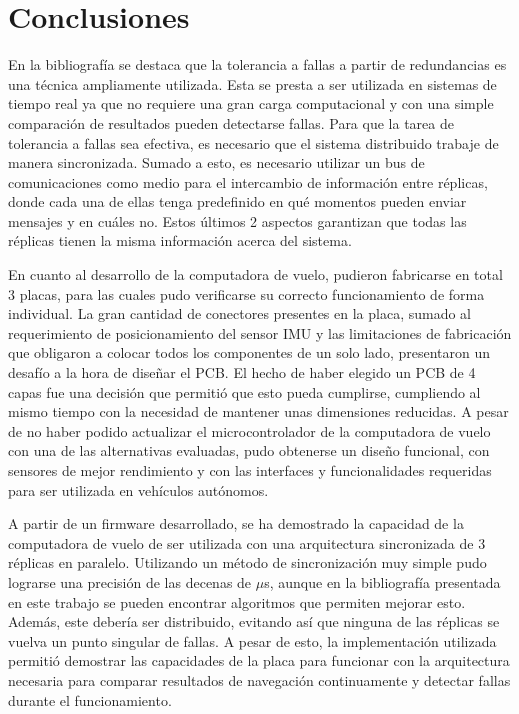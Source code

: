 \section{Conclusiones}

En la bibliografía se destaca que la tolerancia a fallas a partir de redundancias es una técnica ampliamente utilizada. Esta se presta a ser utilizada en sistemas de tiempo real ya que no requiere una gran carga computacional y con una simple comparación de resultados pueden detectarse fallas. Para que la tarea de tolerancia a fallas sea efectiva, es necesario que el sistema distribuido trabaje de manera sincronizada. Sumado a esto, es necesario utilizar un bus de comunicaciones como medio para el intercambio de información entre réplicas, donde cada una de ellas tenga predefinido en qué momentos pueden enviar mensajes y en cuáles no. Estos últimos 2 aspectos garantizan que todas las réplicas tienen la misma información acerca del sistema.

En cuanto al desarrollo de la computadora de vuelo, pudieron fabricarse en total 3 placas, para las cuales pudo verificarse su correcto funcionamiento de forma individual. La gran cantidad de conectores presentes en la placa, sumado al requerimiento de posicionamiento del sensor IMU y las limitaciones de fabricación que obligaron a colocar todos los componentes de un solo lado, presentaron un desafío a la hora de diseñar el PCB. El hecho de haber elegido un PCB de 4 capas fue una decisión que permitió que esto pueda cumplirse, cumpliendo al mismo tiempo con la necesidad de mantener unas dimensiones reducidas. A pesar de no haber podido actualizar el microcontrolador de la computadora de vuelo con una de las alternativas evaluadas, pudo obtenerse un diseño funcional, con sensores de mejor rendimiento y con las interfaces y funcionalidades requeridas para ser utilizada en vehículos autónomos.

A partir de un firmware desarrollado, se ha demostrado la capacidad de la computadora de vuelo de ser utilizada con una arquitectura sincronizada de 3 réplicas en paralelo. Utilizando un método de sincronización muy simple pudo lograrse una precisión de las decenas de $\mu$s, aunque en la bibliografía presentada en este trabajo se pueden encontrar algoritmos que permiten mejorar esto. Además, este debería ser distribuido, evitando así que ninguna de las réplicas se vuelva un punto singular de fallas. A pesar de esto, la implementación utilizada permitió demostrar las capacidades de la placa para funcionar con la arquitectura necesaria para comparar resultados de navegación continuamente y detectar fallas durante el funcionamiento. 

